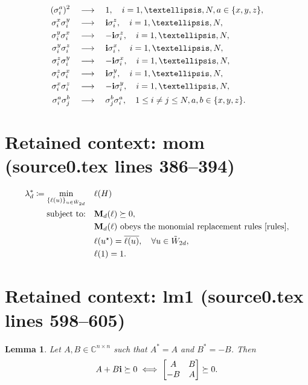 \documentclass[10pt,a4paper]{amsart}
\def\C{{\mathbb{C}}}
\def\MM{{\mathbf{M}}}
\def\bi{\hbox{\bf{i}}}
\theoremstyle{plain}
\newtheorem{lemma}[theorem]{Lemma}
\theoremstyle{definition}
\theoremstyle{remark}
\begin{document}
\begin{subequations}\label{rules}
\begin{align}
    (\sigma_i^a)^2\quad&\longrightarrow\quad1,\quad i=1,\ldots,N,a\in\{x,y,z\},\\
    \sigma_i^x\sigma_i^y\quad&\longrightarrow\quad\bi\sigma_i^z,\quad i=1,\ldots,N,\label{rule1}\\
    \sigma_i^y\sigma_i^x\quad&\longrightarrow\quad-\bi\sigma_i^z,\quad i=1,\ldots,N,\\
    \sigma_i^y\sigma_i^z\quad&\longrightarrow\quad\bi\sigma_i^x,\quad i=1,\ldots,N,\\
    \sigma_i^z\sigma_i^y\quad&\longrightarrow\quad-\bi\sigma_i^x,\quad i=1,\ldots,N,\\
    \sigma_i^z\sigma_i^x\quad&\longrightarrow\quad\bi\sigma_i^y,\quad i=1,\ldots,N,\\
    \sigma_i^x\sigma_i^z\quad&\longrightarrow\quad-\bi\sigma_i^y,\quad i=1,\ldots,N,\label{rule6}\\
    \sigma_i^a\sigma_j^b\quad&\longrightarrow\quad\sigma_j^b\sigma_i^a,\quad 1\le i\ne j\le N,a,b\in\{x,y,z\}.
\end{align}
\end{subequations}


\section*{Retained context: mom (source0.tex lines 386--394)}

\begin{equation}\label{mom}
\begin{aligned}
\lambda_d^*\coloneqq\min\limits_{\{\ell(u)\}_{u\in\tilde{W}_{2d}}}&\quad\ell(H)\\
    \text{subject to:}&\quad\MM_{d}(\ell)\succeq0, \\
    &\quad\MM_{d}(\ell) \text{ obeys the monomial replacement rules \eqref{rules}},\\
    &\quad\ell(u^{\star})=\overline{\ell(u)},\quad \forall u\in\tilde{W}_{2d},\\
    &\quad\ell(1)=1.
\end{aligned}
\end{equation}


\section*{Retained context: lm1 (source0.tex lines 598--605)}

\begin{lemma}\label{lm1}
Let $A,B\in\C^{n\times n}$ such that $A^*=A$ and $B^*=-B$. Then
\begin{equation}
A+B\bi\succeq0\iff\begin{bmatrix}
    A&B\\-B&A
\end{bmatrix}\succeq0.
\end{equation}
\end{lemma}
\end{document}
